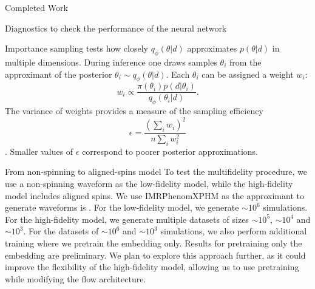 \documentclass[11pt,a4paper,oneside]{book}
\numberwithin{equation}{chapter}
\numberwithin{table}{chapter}
\numberwithin{figure}{chapter}
\begin{document}
\begin{chapter}{Completed Work}
\begin{section}{Diagnostics to check the performance of the neural network}

Importance sampling tests how closely $q_{\phi}(\theta|d)$ approximates $p(\theta|d)$ in multiple dimensions.
During inference one draws samples $\theta_{i}$ from the approximant of the posterior $\theta_{i}\sim q_{\phi}(\theta|d)$.
Each $\theta_{i}$ can be assigned a weight $w_{i}$:
\begin{equation}
w_{i} \propto \frac{\pi(\theta_{i})p(d|\theta_{i})}{q_{\phi}(\theta_{i}|d)}.
\end{equation}
The variance of weights provides a measure of the sampling efficiency
\begin{equation}
\epsilon = \frac{\left(\sum_{i}w_{i}\right)^{2}}{n\sum_{i}w_{i}^{2}}
\end{equation}
\cite{2023PhRvL.130q1403D}.
Smaller values of $\epsilon$ correspond to poorer posterior approximations.


\end{section}


\begin{section}{From non-spinning to aligned-spins model}
To test the multifidelity procedure, we use a non-spinning waveform as the low-fidelity model, while the high-fidelity model includes aligned spins.
We use IMRPhenomXPHM as the approximant to generate waveforms is .
For the low-fidelity model, we generate $\sim 10^{6}$ simulations.
For the high-fidelity model, we generate multiple datasets of sizes $\sim 10^{5}$, $\sim 10^{4}$ and $\sim 10^{3}$.
For the datasets of $\sim10^{6}$ and $\sim10^{3}$ simulations, we also perform additional training where we pretrain the embedding only.
Results for pretraining only the embedding are preliminary.
We plan to explore this approach further, as it could improve the flexibility of the high-fidelity model, allowing us to use pretraining while modifying the flow architecture.


\end{section}
\end{chapter}
\end{document}

